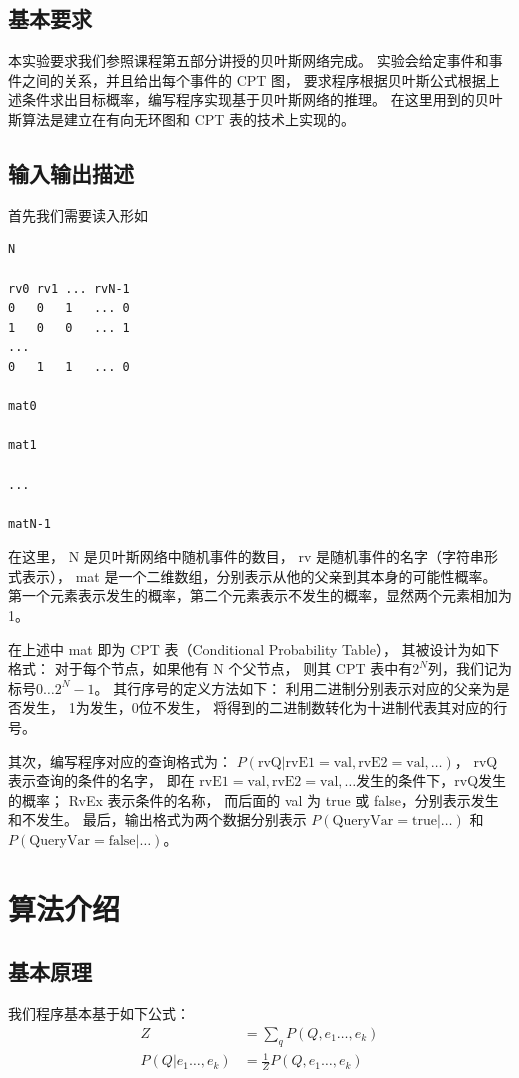 \documentclass[12pt,onecolumn]{report}
\theoremstyle{plain}
\numberwithin{figure}{section}
\begin{document}
\subsection{基本要求}
本实验要求我们参照课程第五部分讲授的贝叶斯网络完成。
实验会给定事件和事件之间的关系，并且给出每个事件的 CPT 图，
要求程序根据贝叶斯公式根据上述条件求出目标概率，编写程序实现基于贝叶斯网络的推理。
在这里用到的贝叶斯算法是建立在有向无环图和 CPT 表的技术上实现的。
\subsection{输入输出描述}
首先我们需要读入形如
\begin{lstlisting}
N

rv0	rv1	...	rvN-1
0	0	1	...	0
1	0	0	...	1
...
0	1	1	...	0

mat0

mat1

...

matN-1
\end{lstlisting}

在这里，
N	是贝叶斯网络中随机事件的数目，
rv 是随机事件的名字（字符串形式表示），
mat 是一个二维数组，分别表示从他的父亲到其本身的可能性概率。
第一个元素表示发生的概率，第二个元素表示不发生的概率，显然两个元素相加为 1。

在上述中 mat 即为 CPT 表（Conditional Probability Table），
其被设计为如下格式：
对于每个节点，如果他有 N 个父节点，
则其 CPT 表中有$2^N$列，我们记为标号$0 \ldots 2^{N}-1$。
其行序号的定义方法如下：
利用二进制分别表示对应的父亲为是否发生，
1为发生，0位不发生，
将得到的二进制数转化为十进制代表其对应的行号。

其次，编写程序对应的查询格式为：
$P(\text{rvQ} \vert \text{rvE1}=\text{val},\text{rvE2}=\text{val},\ldots)$，
rvQ 表示查询的条件的名字，
即在 $\text{rvE1}=\text{val},\text{rvE2}=\text{val}, \ldots$发生的条件下，rvQ发生的概率；
RvEx 表示条件的名称， 而后面的 val 为 true 或 false，分别表示发生和不发生。
最后，输出格式为两个数据分别表示
$P(\text{QueryVar}=\text{true} \vert \ldots)$	和 $P(\text{QueryVar}=\text{false} \vert \ldots)$。

\section{算法介绍}
\subsection{基本原理}
我们程序基本基于如下公式：
\begin{align}
  Z &= \sum_{q} P(Q, e_{1} \ldots, e_{k}) \\
  P(Q \vert e_{1} \ldots, e_{k}) &= \frac{1}{Z} P(Q, e_{1} \ldots, e_{k})
\end{align}
\end{document}
